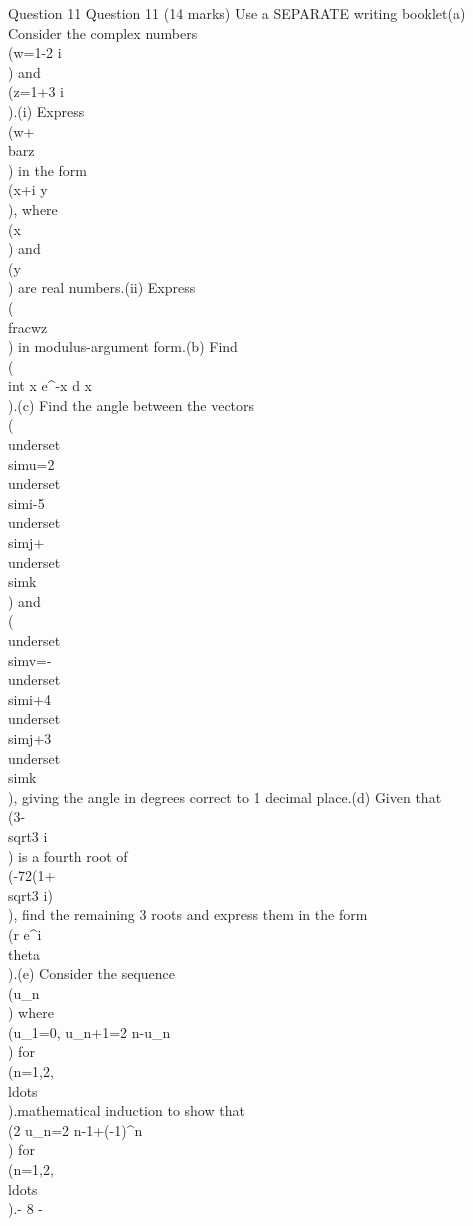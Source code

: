 Question 11
Question 11 (14 marks) Use a SEPARATE writing booklet\n(a) Consider the complex numbers \\(w=1-2 i\\) and \\(z=1+3 i\\).\n(i) Express \\(w+\\bar{z}\\) in the form \\(x+i y\\), where \\(x\\) and \\(y\\) are real numbers.\n(ii) Express \\(\\frac{w}{z}\\) in modulus-argument form.\n{}\n(b) Find \\(\\int x e^{-x} d x\\).\n{}\n(c) Find the angle between the vectors \\(\\underset{\\sim}{u}=2 \\underset{\\sim}{i}-5 \\underset{\\sim}{j}+\\underset{\\sim}{k}\\) and \\(\\underset{\\sim}{v}=-\\underset{\\sim}{i}+4 \\underset{\\sim}{j}+3 \\underset{\\sim}{k}\\), giving\n{} the angle in degrees correct to 1 decimal place.\n(d) Given that \\(3-\\sqrt{3} i\\) is a fourth root of \\(-72(1+\\sqrt{3} i)\\), find the remaining 3 roots\n{} and express them in the form \\(r e^{i \\theta}\\).\n(e) Consider the sequence \\(u_{n}\\) where \\(u_{1}=0, u_{n+1}=2 n-u_{n}\\) for \\(n=1,2, \\ldots\\).\n{}\n\nUse mathematical induction to show that \\(2 u_{n}=2 n-1+(-1)^{n}\\) for \\(n=1,2, \\ldots\\).\n\n- 8 -
